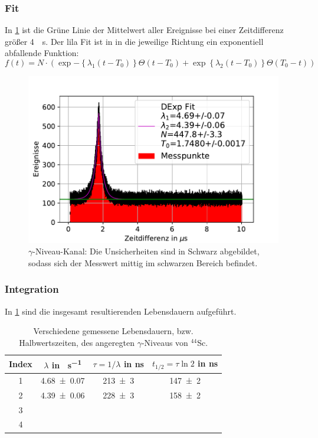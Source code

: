 \documentclass[
	a4paper,
	12pt,
	pagesize,
	ngerman
]{scrartcl}
\begin{document}
		\subsubsection*{Fit}
		In \cref{fig_zeitdifferenz} ist die Grüne Linie der Mittelwert aller Ereignisse bei einer Zeitdifferenz größer \SI{4}{\mu s}.
		Der lila Fit ist in in die jeweilige Richtung ein exponentiell abfallende Funktion:
		\begin{equation}
			\label{eq_dexp}
			f(t)=N\cdot (\exp{-\left\{\lambda_1(t-T_0)\right\}}\Theta(t-T_0)+\exp{\left\{\lambda_2(t-T_0)\right\}}\Theta(T_0-t))
		\end{equation}
	\begin{figure}[H]
				\includegraphics[width= 0.9 \linewidth]{img/Zeitdifferenzen}
				\caption{
					$\gamma$-Niveau-Kanal:
				Die Unsicherheiten sind in Schwarz abgebildet, sodass sich der Messwert mittig im schwarzen Bereich befindet.
				}
				\label{fig_zeitdifferenz}
		\end{figure}
		\subsubsection*{Integration}

		In \cref{tb_leb} sind die insgesamt resultierenden Lebensdauern aufgeführt.
		\begin{table}[H]
		\centering
		\begin{tabular}{c | c | c | c  }
			 Index&$\lambda$ in \si{\mu s^{-1}}& $\tau=1/\lambda$ in \si{ns} &$t_{1/2}=\tau\ln 2$ in \si{ns}\\ \hline
			 1&\SI{4.68+-0.07}{}&\SI{213+-3}{}&\SI{147+-2}{} \\
			 2&\SI{4.39+-0.06}{}&\SI{228+-3}{}&\SI{158+-2}{} \\
			 3\\
			 4\\
		\end{tabular}
		\caption{
		Verschiedene gemessene Lebensdauern, bzw. Halbwertszeiten, des angeregten $\gamma$-Niveaus von $^{44}$Sc.
		}
			 \label{tb_leb}
	\end{table}
\end{document}
